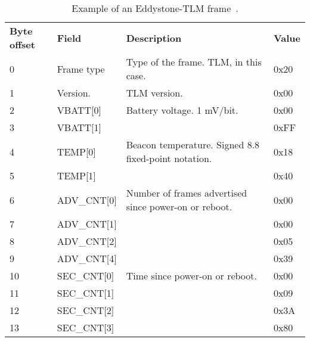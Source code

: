 \begin{table}[!htb]
\centering
\caption{Example of an Eddystone-TLM frame~\cite{eddystone:protocol-tlm-spec}.}
\label{tbl:design:ble-positioning:eddystone-tlm}
\begin{tabular}{llll}
\textbf{Byte offset} & \textbf{Field}  & \textbf{Description}                                                        & \textbf{Value} \\
0                    & Frame type      & Type of the frame. TLM, in this case.                                       & 0x20           \\
1                    & Version.        & TLM version.                                                                & 0x00           \\
2                    & VBATT{[}0{]}    & Battery voltage. 1 mV/bit.                                                  & 0x00           \\
3                    & VBATT{[}1{]}    &                                                                             & 0xFF           \\
4                    & TEMP{[}0{]}     & Beacon temperature. Signed 8.8 fixed-point notation. & 0x18           \\
5                    & TEMP{[}1{]}     &                                                                             & 0x40           \\
6                    & ADV\_CNT{[}0{]} & Number of frames advertised since power-on or reboot.                        & 0x00           \\
7                    & ADV\_CNT{[}1{]} &                                                                             & 0x00           \\
8                    & ADV\_CNT{[}2{]} &                                                                             & 0x05           \\
9                    & ADV\_CNT{[}4{]} &                                                                             & 0x39           \\
10                   & SEC\_CNT{[}0{]} & Time since power-on or reboot.                                               & 0x00           \\
11                   & SEC\_CNT{[}1{]} &                                                                             & 0x09           \\
12                   & SEC\_CNT{[}2{]} &                                                                             & 0x3A           \\
13                   & SEC\_CNT{[}3{]} &                                                                             & 0x80
\end{tabular}
\end{table}

